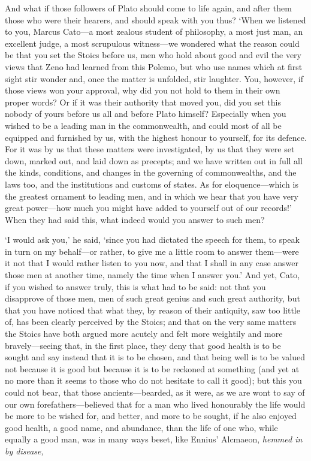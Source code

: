  And what if those followers of Plato should come to life again, and after them those who were their hearers, and should speak with you thus? `When we listened to you, Marcus Cato—a most zealous student of philosophy, a most just man, an excellent judge, a most scrupulous witness—we wondered what the reason could be that you set the Stoics before us, men who hold about good and evil the very views that Zeno had learned from this Polemo, but who use names which at first sight stir wonder and, once the matter is unfolded, stir laughter. You, however, if those views won your approval, why did you not hold to them in their own proper words? Or if it was their authority that moved you, did you set this nobody of yours before us all and before Plato himself? Especially when you wished to be a leading man in the commonwealth, and could most of all be equipped and furnished by us, with the highest honour to yourself, for its defence. For it was by us that these matters were investigated, by us that they were set down, marked out, and laid down as precepts; and we have written out in full all the kinds, conditions, and changes in the governing of commonwealths, and the laws too, and the institutions and customs of states. As for eloquence—which is the greatest ornament to leading men, and in which we hear that you have very great power—how much you might have added to yourself out of our records!' When they had said this, what indeed would you answer to such men?

 `I would ask you,' he said, `since you had dictated the speech for them, to speak in turn on my behalf—or rather, to give me a little room to answer them—were it not that I would rather listen to you now, and that I shall in any case answer those men at another time, namely the time when I answer you.' And yet, Cato, if you wished to answer truly, this is what had to be said: not that you disapprove of those men, men of such great genius and such great authority, but that you have noticed that what they, by reason of their antiquity, saw too little of, has been clearly perceived by the Stoics; and that on the very same matters the Stoics have both argued more acutely and felt more weightily and more bravely—seeing that, in the first place, they deny that good health is to be sought and say instead that it is to be chosen, and that being well is to be valued not because it is good but because it is to be reckoned at something (and yet at no more than it seems to those who do not hesitate to call it good); but this you could not bear, that those ancients—bearded, as it were, as we are wont to say of our own forefathers—believed that for a man who lived honourably the life would be more to be wished for, and better, and more to be sought, if he also enjoyed good health, a good name, and abundance, than the life of one who, while equally a good man, was in many ways beset, like Ennius' Alcmaeon, \textit{hemmed in by disease,}

